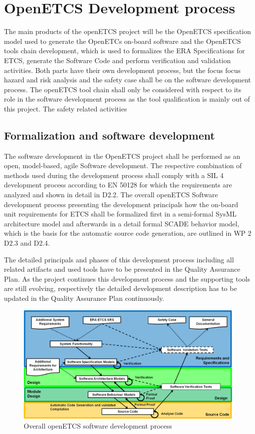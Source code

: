 \documentclass{template/openetcs_report}
\begin{document}
\chapter{OpenETCS Development process}
\label{sec:development-process}

The main products of the openETCS project will be the OpenETCS specification model used to generate the OpenETCs on-board software and the OpenETCS tools chain development, which is used to formalizes the ERA Specifications for ETCS, generate the Software Code and perform verification and validation activities. Both parts have their own development process, but the focus focus hazard and risk analysis and the safety case shall be on the software development process. The openETCS tool chain shall only be considered with respect to its role in the software development process as the tool qualification is mainly out of this project.
The safety related activities 

\section{Formalization and software development}

The software development in the OpenETCS project shall be performed as an open, model-based, agile Software development. The respective combination of methods used during the development process shall comply with a SIL 4 development process according to EN 50128 for which the requirements are analyzed and shown in detail in D2.2. The overall openETCS Software development process presenting the development principals how the on-board unit requirements for ETCS shall be formalized first in a semi-formal SysML architecture model and afterwards in a detail formal SCADE behavior model, which is the basis for the automatic source code generation, are outlined in WP 2 D2.3 and D2.4. 

The detailed principals and phases of this development process including all related artifacts and used tools have to be presented in the Quality Assurance Plan.  As the project continues this development process and the supporting tools are still evolving, respectively the detailed development description has to be updated in the Quality Assurance Plan continuously.

\begin{figure}[htbp]
\centering
\includegraphics[width=0.9\linewidth]{./images/openETCS-Software-Development}
\caption{Overall openETCS software development process}
\label{fig:DevopmentProcess}
\end{figure}
\end{document}
